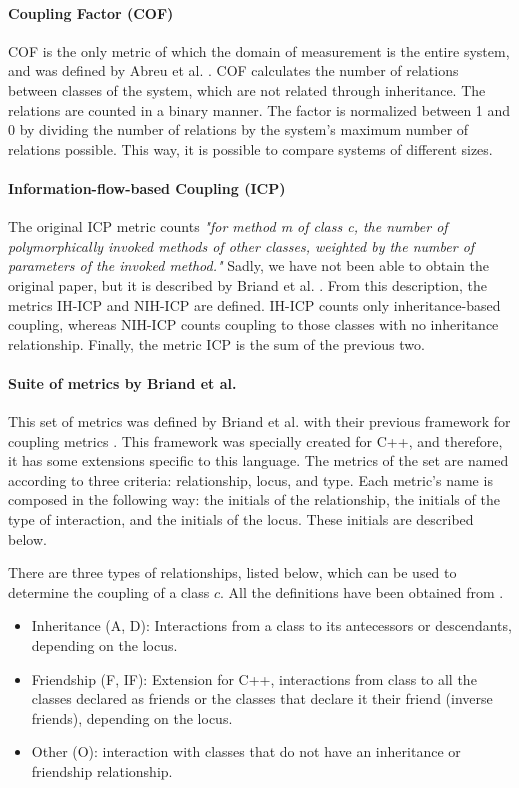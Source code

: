 \paragraph{Coupling Factor (COF)} COF is the only metric of which the domain of measurement is the entire system, and was defined by Abreu et al. \cite{abreu1995toward}. COF calculates the number of relations between classes of the system, which are not related through inheritance. The relations are counted in a binary manner. The factor is normalized between 1 and 0 by dividing the number of relations by the system's maximum number of relations possible. This way, it is possible to compare systems of different sizes.

\paragraph{Information-flow-based Coupling (ICP)} The original ICP metric counts \textit{"for method m of class c, the number of polymorphically invoked methods of other classes, weighted by the number of parameters of the invoked method."} Sadly, we have not been able to obtain the original paper, but it is described by Briand et al. \cite{briand1999unified}. From this description, the metrics IH-ICP and NIH-ICP are defined. IH-ICP counts only inheritance-based coupling, whereas NIH-ICP counts coupling to those classes with no inheritance relationship. Finally, the metric ICP is the sum of the previous two.

\paragraph{Suite of metrics by Briand et al.} This set of metrics was defined by Briand et al. with their previous framework for coupling metrics \cite{briand1997investigation}. This framework was specially created for C++, and therefore, it has some extensions specific to this language.
The metrics of the set are named according to three criteria: relationship, locus, and type. Each metric's name is composed in the following way: the initials of the relationship, the initials of the type of interaction, and the initials of the locus. These initials are described below.

\blankl
There are three types of relationships, listed below, which can be used to determine the coupling of a class $c$. All the definitions have been obtained from \cite{briand1997investigation}.

\begin{itemize}
  \item Inheritance (A, D): Interactions from a class to its antecessors or descendants, depending on the locus.
  \item Friendship (F, IF): Extension for C++, interactions from class to all the classes declared as friends or the classes that declare it their friend (inverse friends), depending on the locus.
  \item Other (O): interaction with classes that do not have an inheritance or friendship relationship.
\end{itemize}

